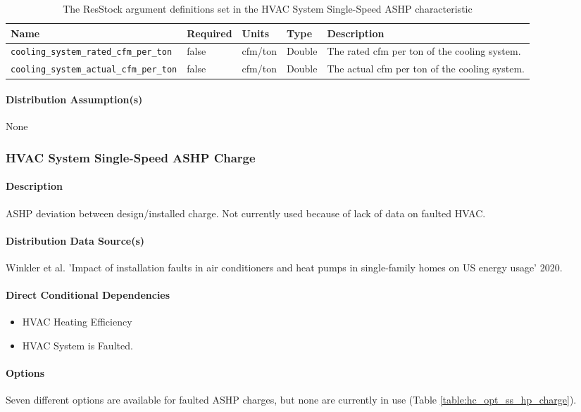 \begin{longtable}[]{|p{4.5cm}|p{1.5cm}|p{1.3cm}|p{1.1cm}|p{4.3cm}|} \caption{The ResStock argument definitions set in the HVAC System Single-Speed ASHP characteristic} \label{table:hc_arg_def_hvac_single_speed}\\
\toprule\noalign{}
Name & Required & Units & Type &  Description \\
\midrule\noalign{}
\endhead
\bottomrule\noalign{}
\endlastfoot
\texttt{cooling\_system\_rated\_cfm\_per\_ton} & false & cfm/ton &
Double &  The rated cfm per ton of the cooling system. \\
\hline
\texttt{cooling\_system\_actual\_cfm\_per\_ton} & false & cfm/ton &
Double &  The actual cfm per ton of the cooling system. \\
\end{longtable}
\paragraph{Distribution Assumption(s)}
None

\subsubsection{HVAC System Single-Speed ASHP Charge}

\paragraph{Description}
ASHP deviation between design/installed charge. Not currently used because of lack of data on faulted HVAC. 

\paragraph{Distribution Data Source(s)}
Winkler et al. 'Impact of installation faults in air conditioners and heat pumps in single-family homes on US energy usage' 2020.

\paragraph{Direct Conditional Dependencies}
\begin{itemize}
    \item HVAC Heating Efficiency
    \item HVAC System is Faulted.
\end{itemize}

\paragraph{Options}
Seven different options are available for faulted ASHP charges, but none are currently in use (Table \ref{table:hc_opt_ss_hp_charge}).

